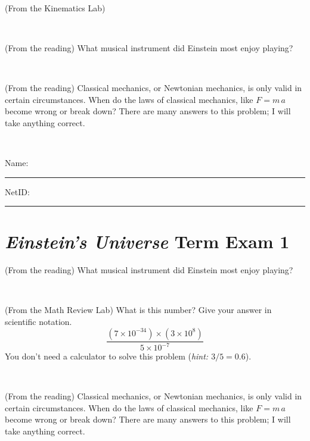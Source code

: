 \documentclass[12pt, letterpaper]{article}
\begin{document}
\vfill ~

\begin{problem} (From the Kinematics Lab)

\end{problem}


\vfill ~

\begin{problem} (From the reading)
What musical instrument did Einstein most enjoy playing?
\end{problem}


\vfill ~

\begin{problem} (From the reading)
Classical mechanics, or Newtonian mechanics, is only valid in certain
circumstances. When do the laws of classical mechanics, like $F =
m\,a$ become wrong or break down? There are many answers to this
problem; I will take anything correct.
\end{problem}


\vfill ~


\cleardoublepage



\noindent
Name: \rule[-1ex]{0.60\textwidth}{0.1pt}
NetID: \rule[-1ex]{0.20\textwidth}{0.1pt}

\section*{\textsl{Einstein's Universe} Term Exam 1}
\setcounter{problem}{1}


\begin{problem} (From the reading)
What musical instrument did Einstein most enjoy playing?
\end{problem}


\vfill ~

\begin{problem} (From the Math Review Lab)
What is this number? Give your answer in scientific notation.
$$
\frac{(7\times10^{-34})\times(3\times10^8)}{5\times10^{-7}}
$$
You don't need a calculator to solve this problem (\textit{hint: $3/5=0.6$}).
\end{problem}


\vfill ~

\begin{problem} (From the reading)
Classical mechanics, or Newtonian mechanics, is only valid in certain
circumstances. When do the laws of classical mechanics, like $F =
m\,a$ become wrong or break down? There are many answers to this
problem; I will take anything correct.
\end{problem}
\end{document}
